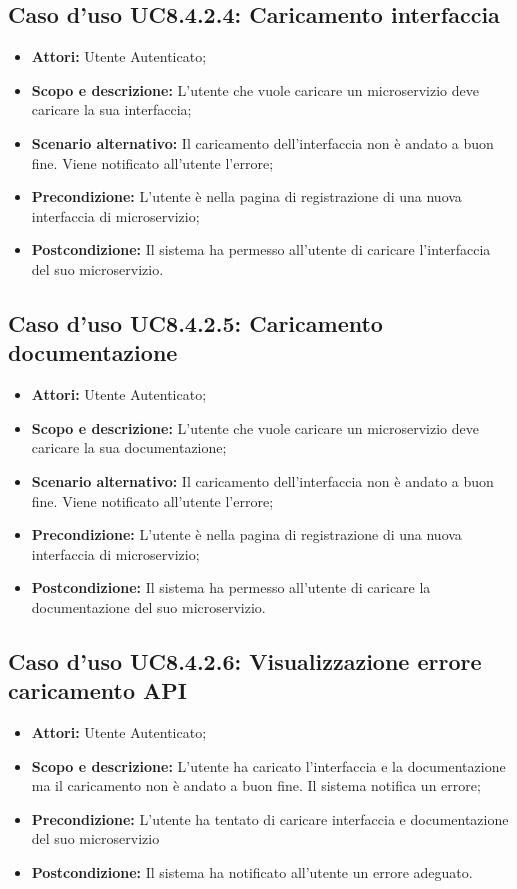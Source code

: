 \documentclass[12pt,a4paper,titlepage]{article}
\begin{document}
	\subsection{Caso d'uso UC8.4.2.4: Caricamento interfaccia}
	\label{UC8.4.2.4}
	\begin{itemize}
		\item \textbf{Attori: }Utente Autenticato;
		\item \textbf{Scopo e descrizione: }L'utente che vuole caricare un microservizio deve caricare la sua interfaccia;
		\item \textbf{Scenario alternativo: }Il caricamento dell'interfaccia non è andato a buon fine. Viene notificato all'utente l'errore;
		\item \textbf{Precondizione: }L'utente è nella pagina di registrazione di una nuova interfaccia di microservizio;
		\item \textbf{Postcondizione: }Il sistema ha permesso all'utente di caricare l'interfaccia del suo microservizio.
	\end{itemize}
	\subsection{Caso d'uso UC8.4.2.5: Caricamento documentazione}
	\label{UC8.4.2.5}
	\begin{itemize}
		\item \textbf{Attori: }Utente Autenticato;
		\item \textbf{Scopo e descrizione: }L'utente che vuole caricare un microservizio deve caricare la sua documentazione;
		\item \textbf{Scenario alternativo: }Il caricamento dell'interfaccia non è andato a buon fine. Viene notificato all'utente l'errore;
		\item \textbf{Precondizione: }L'utente è nella pagina di registrazione di una nuova interfaccia di microservizio;
		\item \textbf{Postcondizione: }Il sistema ha permesso all'utente di caricare la documentazione del suo microservizio.
	\end{itemize}
	\subsection{Caso d'uso UC8.4.2.6: Visualizzazione errore caricamento API}
	\label{UC8.4.2.6}
	\begin{itemize}
		\item \textbf{Attori: }Utente Autenticato;
		\item \textbf{Scopo e descrizione: }L'utente ha caricato l'interfaccia e la documentazione ma il caricamento non è andato a buon fine. Il sistema notifica un errore;
		\item \textbf{Precondizione: }L'utente ha tentato di caricare interfaccia e documentazione del suo microservizio
		\item \textbf{Postcondizione: }Il sistema ha notificato all'utente un errore adeguato.
	\end{itemize}
\end{document}
